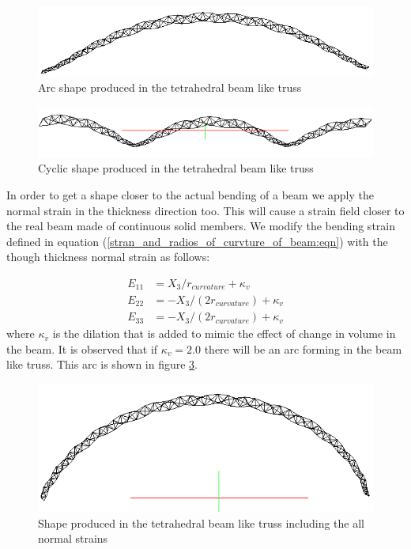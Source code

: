 \begin{figure} 
\centering
\includegraphics[width=5.0in]{./chap_5_active_trusses/images_linear_tetrahedral/tetra_hedral_arc_pi_shape.png}
\caption{Arc shape produced in the tetrahedral beam like truss}
\label{fig:tetra_hedral_arc_pi_shape}
\end{figure}  


\begin{figure} 
\centering
\includegraphics[width=5.0in]{./chap_5_active_trusses/images_linear_tetrahedral/tetra_hedral_arc_2_pi_shape.png}
\caption{Cyclic shape produced in the tetrahedral beam like truss}
\label{fig:tetra_hedral_arc_2_pi_shape}
\end{figure} 

In order to get a shape closer to the actual bending of a beam we apply the normal strain in the thickness direction too.
This will cause a strain field closer to the real beam made of continuous solid members.
We modify the bending strain defined in equation (\ref{stran_and_radios_of_curvture_of_beam:eqn}) with the though thickness normal strain as follows:

\begin{equation}
\begin{aligned}
E_{11}&=X_3/r_{curvature}+\kappa_v \\
E_{22}&=-X_3/(2r_{curvature})+\kappa_v \\
E_{33}&=-X_3/(2r_{curvature})+\kappa_v
\end{aligned}
\label{strain_with_dilation:eqn}
\end{equation}
where $\kappa_v$ is the dilation that is added to mimic the effect of change in volume in the beam.
It is observed that if $\kappa_v=2.0$ there will be an arc forming in the beam like truss.
This arc is shown in figure \ref{fig:tetra_hedral_arc_2_pi_shape_with_pressure}.
\begin{figure} 
\centering
\includegraphics[width=5.0in]{./chap_5_active_trusses/images_linear_tetrahedral/tetra_hedral_arc_2_pi_shape_with_pressure.png}
\caption{Shape produced in the tetrahedral beam like truss including the all normal strains}
\label{fig:tetra_hedral_arc_2_pi_shape_with_pressure}
\end{figure} 

